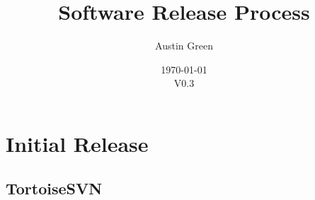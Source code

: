 \documentclass[10pt]{article}
\title{Software Release Process}
\author{Austin Green}
\date{\today\\V0.3}
\begin{document}
    \begin{titlepage}
    \maketitle
    \thispagestyle{empty}
    \end{titlepage}

	\tableofcontents
	\newpage

    \section{Initial Release}
        \subsection{TortoiseSVN}
\end{document}

